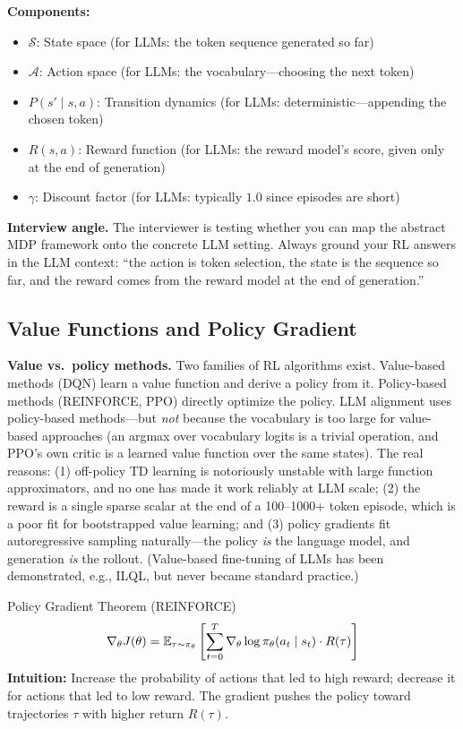 \textbf{Components:}
\begin{itemize}
    \item $\mathcal{S}$: State space (for LLMs: the token sequence generated so far)
    \item $\mathcal{A}$: Action space (for LLMs: the vocabulary---choosing the next token)
    \item $P(s' \mid s, a)$: Transition dynamics (for LLMs: deterministic---appending the chosen token)
    \item $R(s, a)$: Reward function (for LLMs: the reward model's score, given only at the end of generation)
    \item $\gamma$: Discount factor (for LLMs: typically $1.0$ since episodes are short)
\end{itemize}

\textbf{Interview angle.} The interviewer is testing whether you can map the abstract MDP framework onto the concrete LLM setting. Always ground your RL answers in the LLM context: ``the action is token selection, the state is the sequence so far, and the reward comes from the reward model at the end of generation.''

\subsection{Value Functions and Policy Gradient}

\textbf{Value vs.\ policy methods.} Two families of RL algorithms exist. Value-based methods (DQN) learn a value function and derive a policy from it. Policy-based methods (REINFORCE, PPO) directly optimize the policy. LLM alignment uses policy-based methods---but \textit{not} because the vocabulary is too large for value-based approaches (an argmax over vocabulary logits is a trivial operation, and PPO's own critic is a learned value function over the same states). The real reasons: (1) off-policy TD learning is notoriously unstable with large function approximators, and no one has made it work reliably at LLM scale; (2) the reward is a single sparse scalar at the end of a 100--1000+ token episode, which is a poor fit for bootstrapped value learning; and (3) policy gradients fit autoregressive sampling naturally---the policy \textit{is} the language model, and generation \textit{is} the rollout. (Value-based fine-tuning of LLMs has been demonstrated, e.g., ILQL, but never became standard practice.)

\begin{mathresult}{Policy Gradient Theorem (REINFORCE)}
\begin{equation}
\nabla_\theta J(\theta) = \operatorname{\mathbb{E}}_{\tau \sim \pi_\theta}\left[\sum_{t=0}^{T} \nabla_\theta \log \pi_\theta(a_t \mid s_t) \cdot R(\tau)\right]
\end{equation}
\textbf{Intuition:} Increase the probability of actions that led to high reward; decrease it for actions that led to low reward. The gradient pushes the policy toward trajectories $\tau$ with higher return $R(\tau)$.
\end{mathresult}

